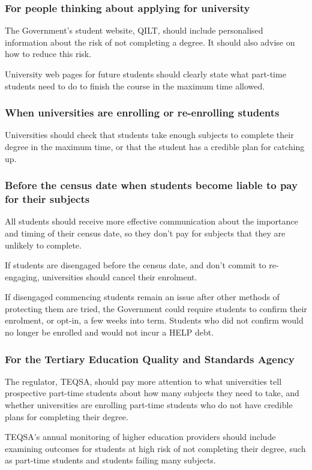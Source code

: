  \begin{recommendations}
 
\subsubsection{For people thinking about applying for university}

    The Government’s student website, QILT, should include personalised information about the risk of not completing a degree. It should also advise on how to reduce this risk. 
    
    University web pages for future students should clearly state what part-time students need to do to finish the course in the maximum time allowed. 

\subsubsection{When universities are enrolling or re-enrolling students}

    Universities should check that students take enough subjects to complete their degree in the maximum time, or that the student has a credible plan for catching up. 

\subsubsection{Before the census date when students become liable to pay for their subjects}

    All students should receive more effective communication about the importance and timing of their census date, so they don’t pay for subjects that they are unlikely to complete. 
    
    If students are disengaged before the census date, and don’t commit to re-engaging, universities should cancel their enrolment. 
    
    If disengaged commencing students remain an issue after other methods of protecting them are tried, the Government could require students to confirm their enrolment, or opt-in, a few weeks into term. Students who did not confirm would no longer be enrolled and would not incur a HELP debt. 


\subsubsection{For the Tertiary Education Quality and Standards Agency}

    The regulator, TEQSA, should pay more attention to what universities tell prospective part-time students about how many subjects they need to take, and whether universities are enrolling part-time students who do not have credible plans for completing their degree. 
    
    TEQSA’s annual monitoring of higher education providers should include examining outcomes for students at high risk of not completing their degree, such as part-time students and students failing many subjects. 


\end{recommendations}